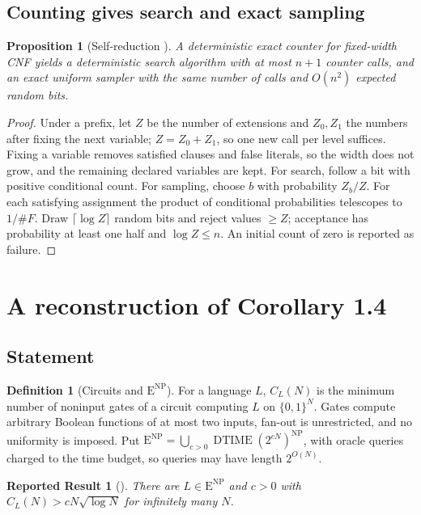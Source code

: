 \documentclass[11pt,reqno]{amsart}
\numberwithin{equation}{section}
\theoremstyle{plain}
\newtheorem{proposition}[theorem]{Proposition}
\newtheorem{reported}[theorem]{Reported Result}
\theoremstyle{definition}
\newtheorem{definition}[theorem]{Definition}
\theoremstyle{remark}
\newcommand{\ENP}{\mathrm E^{\mathrm{NP}}}
\begin{document}
\subsection{Counting gives search and exact sampling}
\begin{proposition}[Self-reduction \cite{JVV}]\label{prop:sampling}
A deterministic exact counter for fixed-width CNF yields a deterministic
search algorithm with at most $n+1$ counter calls, and an exact uniform
sampler with the same number of calls and $O(n^2)$ expected random bits.
\end{proposition}
\begin{proof}
Under a prefix, let $Z$ be the number of extensions and $Z_0,Z_1$ the numbers
after fixing the next variable; $Z=Z_0+Z_1$, so one new call per level
suffices. Fixing a variable removes satisfied clauses and false literals, so
the width does not grow, and the remaining declared variables are kept. For
search, follow a bit with positive conditional count. For sampling, choose
$b$ with probability $Z_b/Z$. For each satisfying assignment the product of
conditional probabilities telescopes to $1/\#F$. Draw $\lceil\log Z\rceil$
random bits and reject values $\ge Z$; acceptance has probability at least
one half and $\log Z\le n$. An initial count of zero is reported as failure.
\end{proof}

\section{A reconstruction of Corollary 1.4}\label{sec:main-proof}

\subsection{Statement}
\begin{definition}[Circuits and $\ENP$]\label{def:circuits}
For a language $L$, $C_L(N)$ is the minimum number of noninput gates of a
circuit computing $L$ on $\{0,1\}^N$. Gates compute arbitrary Boolean
functions of at most two inputs, fan-out is unrestricted, and no uniformity
is imposed. Put $\ENP=\bigcup_{c>0}\operatorname{DTIME}(2^{cN})^{\mathrm{NP}}$,
with oracle queries charged to the time budget, so queries may have length
$2^{O(N)}$.
\end{definition}

\begin{reported}[{\cite[Corollary~1.4]{OpenAIPaper}}]\label{rep:circuits}
There are $L\in\ENP$ and $c>0$ with $C_L(N)>cN\sqrt{\log N}$ for infinitely
many $N$.
\end{reported}
\end{document}
